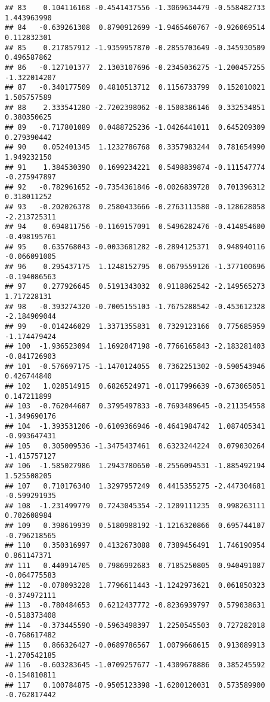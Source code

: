 \documentclass[
]{article}
\begin{document}
\begin{verbatim}
## 83    0.104116168 -0.4541437556 -1.3069634479 -0.558482733  1.443963990
## 84   -0.639261308  0.8790912699 -1.9465460767 -0.926069514  0.112832301
## 85    0.217857912 -1.9359957870 -0.2855703649 -0.345930509  0.496587862
## 86   -0.127101377  2.1303107696 -0.2345036275 -1.200457255 -1.322014207
## 87   -0.340177509  0.4810513712  0.1156733799  0.152010021  1.505757589
## 88    2.333541280 -2.7202398062 -0.1508386146  0.332534851  0.380350625
## 89   -0.717801089  0.0488725236 -1.0426441011  0.645209309  0.279390442
## 90    0.052401345  1.1232786768  0.3357983244  0.781654990  1.949232150
## 91    1.384530390  0.1699234221  0.5498839874 -0.111547774 -0.275947897
## 92   -0.782961652 -0.7354361846 -0.0026839728  0.701396312  0.318011252
## 93   -0.202026378  0.2580433666 -0.2763113580 -0.128628058 -2.213725311
## 94    0.694811756 -0.1169157091  0.5496282476 -0.414854600 -0.498195761
## 95    0.635768043 -0.0033681282 -0.2894125371  0.948940116 -0.066091005
## 96    0.295437175  1.1248152795  0.0679559126 -1.377100696 -0.194086563
## 97    0.277926645  0.5191343032  0.9118862542 -2.149565273  1.717228131
## 98   -0.393274320 -0.7005155103 -1.7675288542 -0.453612328 -2.184909044
## 99   -0.014246029  1.3371355831  0.7329123166  0.775685959 -1.174479424
## 100  -1.936523094  1.1692847198 -0.7766165843 -2.183281403 -0.841726903
## 101  -0.576697175 -1.1470124055  0.7362251302 -0.590543946  0.426744840
## 102   1.028514915  0.6826524971 -0.0117996639 -0.673065051  0.147211899
## 103  -0.762044687  0.3795497833 -0.7693489645 -0.211354558 -1.349690176
## 104  -1.393531206 -0.6109366946 -0.4641984742  1.087405341 -0.993647431
## 105   0.305009536 -1.3475437461  0.6323244224  0.079030264 -1.415757127
## 106  -1.585027986  1.2943780650 -0.2556094531 -1.885492194  1.525508205
## 107   0.710176340  1.3297957249  0.4415355275 -2.447304681 -0.599291935
## 108  -1.231499779  0.7243045354 -2.1209111235  0.998263111  0.702608984
## 109   0.398619939  0.5180988192 -1.1216320866  0.695744107 -0.796218565
## 110   0.350316997  0.4132673088  0.7389456491  1.746190954  0.861147371
## 111   0.440914705  0.7986992683  0.7185250805  0.940491087 -0.064775583
## 112  -0.078093228  1.7796611443 -1.1242973621  0.061850323 -0.374972111
## 113  -0.780484653  0.6212437772 -0.8236939797  0.579038631 -0.518373408
## 114  -0.373445590 -0.5963498397  1.2250545503  0.727282018 -0.768617482
## 115   0.866326427 -0.0689786567  1.0079668615  0.913089913 -1.270542185
## 116  -0.603283645 -1.0709257677 -1.4309678886  0.385245592 -0.154810811
## 117   0.100784875 -0.9505123398 -1.6200120031  0.573589900 -0.762817442

\end{verbatim}
\end{document}
